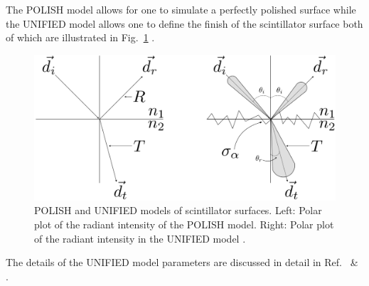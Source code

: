 The POLISH model allows for one to simulate a perfectly polished surface while the UNIFIED model allows one to define the finish of the scintillator surface both of which are illustrated in Fig.~\ref{fig:polished_vs_ground} \cite{scint_surface_sim}.
	\begin{figure}[!htb]
	\centering
	\includegraphics[width=1.0\columnwidth]{simulation/figs/st_unified_sim_v2}
	\caption{POLISH and UNIFIED models of scintillator surfaces.  Left: Polar plot of the radiant intensity of the POLISH model.  Right: Polar plot of the radiant intensity in the UNIFIED model \cite{scint_surface_sim}.}
	\label{fig:polished_vs_ground}
	\end{figure}
The details of the UNIFIED model parameters are discussed in detail in Ref.~\cite{pooser16} \& \cite{scint_surface_sim}.


